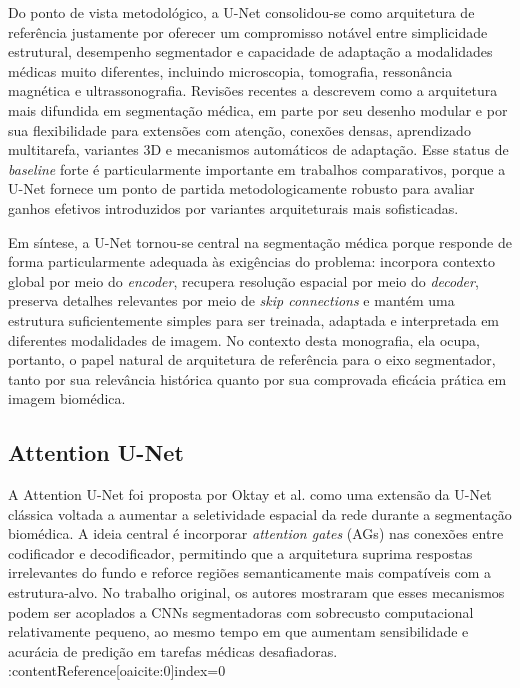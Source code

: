 \documentclass[tcc,capa]{texufpel}
\begin{document}
Do ponto de vista metodológico, a U-Net consolidou-se como arquitetura de referência justamente por oferecer um compromisso notável entre simplicidade estrutural, desempenho segmentador e capacidade de adaptação a modalidades médicas muito diferentes, incluindo microscopia, tomografia, ressonância magnética e ultrassonografia. Revisões recentes a descrevem como a arquitetura mais difundida em segmentação médica, em parte por seu desenho modular e por sua flexibilidade para extensões com atenção, conexões densas, aprendizado multitarefa, variantes 3D e mecanismos automáticos de adaptação. Esse status de \textit{baseline} forte é particularmente importante em trabalhos comparativos, porque a U-Net fornece um ponto de partida metodologicamente robusto para avaliar ganhos efetivos introduzidos por variantes arquiteturais mais sofisticadas. 

Em síntese, a U-Net tornou-se central na segmentação médica porque responde de forma particularmente adequada às exigências do problema: incorpora contexto global por meio do \textit{encoder}, recupera resolução espacial por meio do \textit{decoder}, preserva detalhes relevantes por meio de \textit{skip connections} e mantém uma estrutura suficientemente simples para ser treinada, adaptada e interpretada em diferentes modalidades de imagem. No contexto desta monografia, ela ocupa, portanto, o papel natural de arquitetura de referência para o eixo segmentador, tanto por sua relevância histórica quanto por sua comprovada eficácia prática em imagem biomédica.

\subsection{Attention U-Net}

A Attention U-Net foi proposta por Oktay et al. como uma extensão da U-Net clássica voltada a aumentar a seletividade espacial da rede durante a segmentação biomédica. A ideia central é incorporar \textit{attention gates} (AGs) nas conexões entre codificador e decodificador, permitindo que a arquitetura suprima respostas irrelevantes do fundo e reforce regiões semanticamente mais compatíveis com a estrutura-alvo. No trabalho original, os autores mostraram que esses mecanismos podem ser acoplados a CNNs segmentadoras com sobrecusto computacional relativamente pequeno, ao mesmo tempo em que aumentam sensibilidade e acurácia de predição em tarefas médicas desafiadoras. :contentReference[oaicite:0]{index=0}
\end{document}
